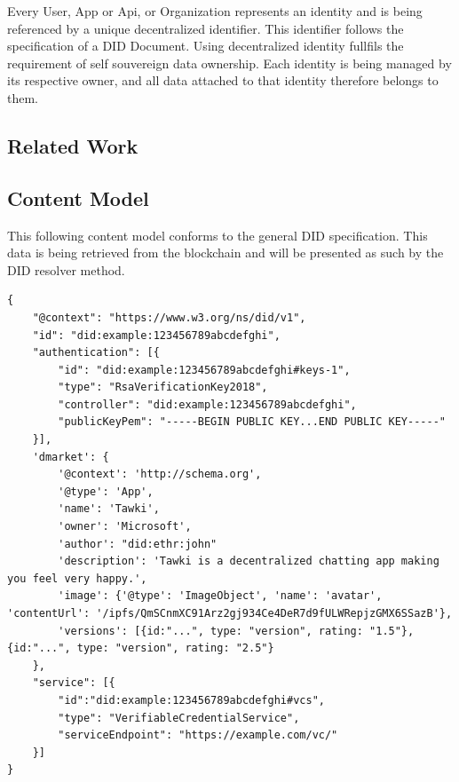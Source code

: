 Every User, App or Api, or Organization represents an identity and is being referenced by a unique decentralized identifier. This identifier follows the specification of a DID Document. Using decentralized identity fullfils the requirement of self souvereign data ownership. Each identity is being managed by its respective owner, and all data attached to that identity therefore belongs to them. 


\subsection{Related Work}



\subsection{Content Model}

This following content model conforms to the general DID specification. This data is being retrieved from the blockchain and will be presented as such by the DID resolver method. 

\begin{lstlisting}[caption={Example app content object}, language=Solidity, label=lst:content_model, numbers=none]
{
    "@context": "https://www.w3.org/ns/did/v1",
    "id": "did:example:123456789abcdefghi",
    "authentication": [{
        "id": "did:example:123456789abcdefghi#keys-1",
        "type": "RsaVerificationKey2018",
        "controller": "did:example:123456789abcdefghi",
        "publicKeyPem": "-----BEGIN PUBLIC KEY...END PUBLIC KEY-----"
    }],
    'dmarket': {
        '@context': 'http://schema.org',
        '@type': 'App',
        'name': 'Tawki',
        'owner': 'Microsoft',
        'author': "did:ethr:john"
        'description': 'Tawki is a decentralized chatting app making you feel very happy.',
        'image': {'@type': 'ImageObject', 'name': 'avatar', 'contentUrl': '/ipfs/QmSCnmXC91Arz2gj934Ce4DeR7d9fULWRepjzGMX6SSazB'},
        'versions': [{id:"...", type: "version", rating: "1.5"}, {id:"...", type: "version", rating: "2.5"}
    },
    "service": [{
        "id":"did:example:123456789abcdefghi#vcs",
        "type": "VerifiableCredentialService",
        "serviceEndpoint": "https://example.com/vc/"
    }]
}   
\end{lstlisting}


